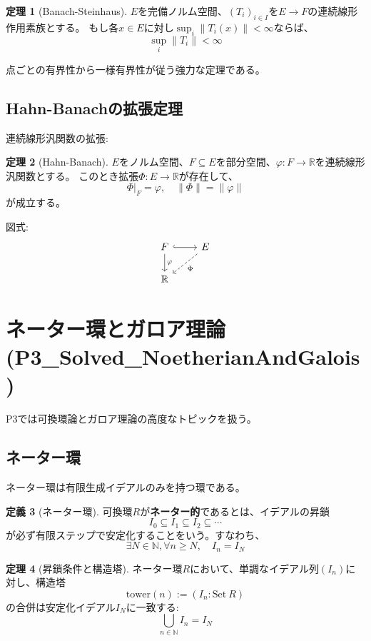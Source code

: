\documentclass[a4paper,12pt]{ltjsarticle}
\theoremstyle{definition}
\newtheorem{theorem}{定理}[section]
\newtheorem{definition}[theorem]{定義}
\begin{document}
\begin{theorem}[Banach-Steinhaus]\label{thm:banach-steinhaus}
$E$を完備ノルム空間、$(T_i)_{i \in I}$を$E \to F$の連続線形作用素族とする。
もし各$x \in E$に対し$\sup_i \|T_i(x)\| < \infty$ならば、
\[
\sup_{i} \|T_i\| < \infty
\]
\end{theorem}

点ごとの有界性から一様有界性が従う強力な定理である。

\subsection{Hahn-Banachの拡張定理}
連続線形汎関数の拡張:

\begin{theorem}[Hahn-Banach]\label{thm:hahn-banach}
$E$をノルム空間、$F \subseteq E$を部分空間、$\varphi: F \to \mathbb{R}$を連続線形汎関数とする。
このとき拡張$\Phi: E \to \mathbb{R}$が存在して、
\[
\Phi|_F = \varphi, \quad \|\Phi\| = \|\varphi\|
\]
が成立する。
\end{theorem}

図式:
\begin{equation*}
\begin{tikzcd}
F \arrow[r, hook] \arrow[d, "\varphi"] & E \arrow[dl, dashed, "\Phi"] \\
\mathbb{R} &
\end{tikzcd}
\end{equation*}

\section{ネーター環とガロア理論(P3\_Solved\_NoetherianAndGalois)}

P3では可換環論とガロア理論の高度なトピックを扱う。

\subsection{ネーター環}
ネーター環は有限生成イデアルのみを持つ環である。

\begin{definition}[ネーター環]\label{def:noetherian}
可換環$R$が\textbf{ネーター的}であるとは、イデアルの昇鎖
\[
I_0 \subseteq I_1 \subseteq I_2 \subseteq \cdots
\]
が必ず有限ステップで安定化することをいう。すなわち、
\[
\exists N \in \mathbb{N}, \forall n \ge N, \quad I_n = I_N
\]
\end{definition}

\begin{theorem}[昇鎖条件と構造塔]\label{thm:acc-tower}
ネーター環$R$において、単調なイデアル列$(I_n)$に対し、構造塔
\[
\text{tower}(n) := (I_n: \text{Set}\ R)
\]
の合併は安定化イデアル$I_N$に一致する:
\[
\bigcup_{n \in \mathbb{N}} I_n = I_N
\]
\end{theorem}
\end{document}
